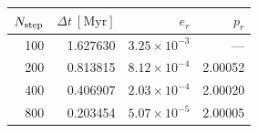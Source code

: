 \begin{tabular}{rrrr}\toprule
$N_{\rm step}$ & $\Delta t\ [\mathrm{Myr}]$ & $e_r$ & $p_r$ \\
\midrule
100 & 1.627630 & $3.25\times 10^{-3}$ & --- \\
200 & 0.813815 & $8.12\times 10^{-4}$ & 2.00052 \\
400 & 0.406907 & $2.03\times 10^{-4}$ & 2.00020 \\
800 & 0.203454 & $5.07\times 10^{-5}$ & 2.00005 \\
\bottomrule\end{tabular}
